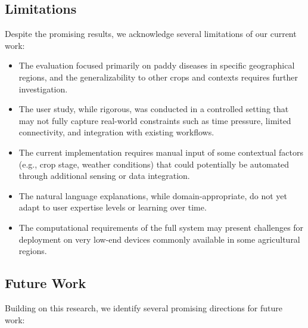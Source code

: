 \subsection{Limitations}

Despite the promising results, we acknowledge several limitations of our current work:

\begin{itemize}
    \item The evaluation focused primarily on paddy diseases in specific geographical regions, and the generalizability to other crops and contexts requires further investigation.
    
    \item The user study, while rigorous, was conducted in a controlled setting that may not fully capture real-world constraints such as time pressure, limited connectivity, and integration with existing workflows.
    
    \item The current implementation requires manual input of some contextual factors (e.g., crop stage, weather conditions) that could potentially be automated through additional sensing or data integration.
    
    \item The natural language explanations, while domain-appropriate, do not yet adapt to user expertise levels or learning over time.
    
    \item The computational requirements of the full system may present challenges for deployment on very low-end devices commonly available in some agricultural regions.
\end{itemize}

\subsection{Future Work}

Building on this research, we identify several promising directions for future work:

